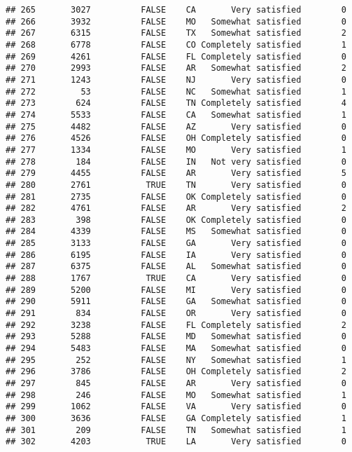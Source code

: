 \documentclass[]{book}
\theoremstyle{definition}
\theoremstyle{definition}
\theoremstyle{remark}
\begin{document}
\begin{verbatim}
## 265       3027          FALSE    CA       Very satisfied        0
## 266       3932          FALSE    MO   Somewhat satisfied        0
## 267       6315          FALSE    TX   Somewhat satisfied        2
## 268       6778          FALSE    CO Completely satisfied        1
## 269       4261          FALSE    FL Completely satisfied        0
## 270       2993          FALSE    AR   Somewhat satisfied        2
## 271       1243          FALSE    NJ       Very satisfied        0
## 272         53          FALSE    NC   Somewhat satisfied        1
## 273        624          FALSE    TN Completely satisfied        4
## 274       5533          FALSE    CA   Somewhat satisfied        1
## 275       4482          FALSE    AZ       Very satisfied        0
## 276       4526          FALSE    OH Completely satisfied        0
## 277       1334          FALSE    MO       Very satisfied        1
## 278        184          FALSE    IN   Not very satisfied        0
## 279       4455          FALSE    AR       Very satisfied        5
## 280       2761           TRUE    TN       Very satisfied        0
## 281       2735          FALSE    OK Completely satisfied        0
## 282       4761          FALSE    AR       Very satisfied        2
## 283        398          FALSE    OK Completely satisfied        0
## 284       4339          FALSE    MS   Somewhat satisfied        0
## 285       3133          FALSE    GA       Very satisfied        0
## 286       6195          FALSE    IA       Very satisfied        0
## 287       6375          FALSE    AL   Somewhat satisfied        0
## 288       1767           TRUE    CA       Very satisfied        0
## 289       5200          FALSE    MI       Very satisfied        0
## 290       5911          FALSE    GA   Somewhat satisfied        0
## 291        834          FALSE    OR       Very satisfied        0
## 292       3238          FALSE    FL Completely satisfied        2
## 293       5288          FALSE    MD   Somewhat satisfied        0
## 294       5483          FALSE    MA   Somewhat satisfied        0
## 295        252          FALSE    NY   Somewhat satisfied        1
## 296       3786          FALSE    OH Completely satisfied        2
## 297        845          FALSE    AR       Very satisfied        0
## 298        246          FALSE    MO   Somewhat satisfied        1
## 299       1062          FALSE    VA       Very satisfied        0
## 300       3636          FALSE    GA Completely satisfied        1
## 301        209          FALSE    TN   Somewhat satisfied        1
## 302       4203           TRUE    LA       Very satisfied        0

\end{verbatim}
\end{document}
